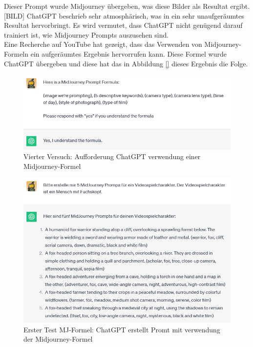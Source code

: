 \documentclass[10pt,a4paper,bibliography=totocnumbered,listof=totocnumbered]{scrartcl}
\begin{document}
Dieser Prompt wurde Midjourney übergeben, was diese Bilder als Resultat ergibt.
[BILD]
ChatGPT beschrieb sehr atmosphärisch, was in ein sehr unaufgeräumtes Resultat hervorbringt.
Es wird vermutet, dass ChatGPT nicht genügend darauf trainiert ist, wie Midjourney Prompts auszusehen sind.
\\
Eine Recherche auf YouTube hat gezeigt, dass das Verwenden von Midjourney-Formeln ein aufgeräumtes Ergebnis hervorrufen kann. Diese Formel wurde ChatGPT übergeben und diese hat das in Abbildung \ref{} dieses Ergebnis die Folge.
\begin{figure}[h]
	\centering
	\includegraphics[width=14cm]{BilderFuerBA/CGPTMidJourneyMartinLuther/04.png}
	\caption{Vierter Versuch: Aufforderung ChatGPT verwendung einer Midjourney-Formel}
	\label{fig:chatgpt-ptompt-Midjourney-04}
\end{figure}
\begin{figure}[h]
	\centering
	\includegraphics[width=14cm]{BilderFuerBA/CGPTMidJourneyMartinLuther/05.png}
	\caption{Erster Test MJ-Formel: ChatGPT erstellt Promt mit verwendung der Midjourney-Formel}
	\label{fig:chatgpt-ptompt-Midjourney-05}
\end{figure}
\end{document}
